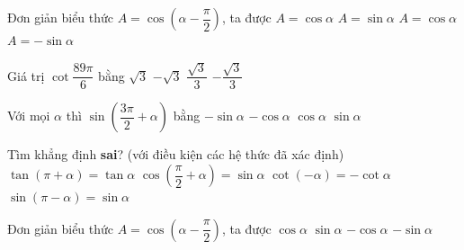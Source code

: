 \begin{ex}%
	Đơn giản biểu thức $  A=\cos\left(\alpha-\dfrac{\pi}{2}\right)$, ta được
	\choice 
		{$A=\cos\alpha $} 
		{\True $A=\sin\alpha  $}
		{$A=\cos\alpha $} 
		{$A=-\sin\alpha $} 
\end{ex}

\begin{ex}%
	Giá  trị $\cot\dfrac{89\pi}{6}$ bằng
	 \choice
		{$\sqrt{3}$} 
		{\True  $-\sqrt{3}$}
		{$\dfrac{\sqrt{3}}{3}$} 
		{$-\dfrac{\sqrt{3}}{3}$} 
\end{ex}

\begin{ex}%
	Với mọi $\alpha $ thì $\sin\left(\dfrac{3\pi}{2}+\alpha\right)$ bằng 
	 \choice
		{$-\sin\alpha  $}
		{\True  $-\cos\alpha $}
		 {$\cos\alpha $}
		 {$\sin\alpha $}
\end{ex}

\begin{ex}%
	Tìm khẳng định \textbf{sai}?  (với điều kiện các hệ thức đã xác định)
	 \choice
		 {$\tan (\pi +\alpha)=\tan \alpha $}
		{\True $\cos  \left(\dfrac{\pi}{2} +\alpha \right)=\sin \alpha $}
		{$\cot  (-\alpha)=-\cot \alpha $}
		{$\sin  (\pi -\alpha)=\sin \alpha $}
\end{ex}

\begin{ex}%
	Đơn giản biểu thức $A=\cos  \left(\alpha -\dfrac{\pi}{2} \right)$, ta được
	\choice 
		{$\cos \alpha  $}
		 {\True $\sin \alpha $}
		{$- \cos  \alpha $}
		{$-\sin \alpha  $}
\end{ex}

